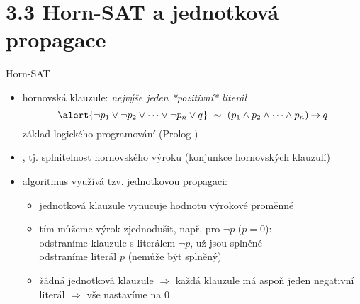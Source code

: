 \documentclass{beamer}
\begin{document}
\section{3.3 Horn-SAT a jednotková propagace}


\begin{frame}{Horn-SAT}

    \begin{itemize}
        \item \alert{hornovská klauzule}: \emph{nejvýše jeden *pozitivní* literál}
        $$
        \alert{\neg p_1\lor \neg p_2\lor \dots \lor \neg p_n\lor q}\ \sim\ (p_1\land p_2\land\dots \land p_n)\limplies q
        $$
        základ logického programování (Prolog )
        \item {}, tj. splnitelnost \alert{hornovského} výroku (konjunkce hornovských klauzulí) 
        \item algoritmus využívá tzv. \alert{jednotkovou propagaci}:  
        \begin{itemize}
            \item jednotková klauzule vynucuje hodnotu výrokové proměnné
            \item tím můžeme výrok zjednodušit, např. pro $\neg p$ ($p=0$):\\
            odstraníme klauzule s literálem $\neg p$, už jsou splněné\\
            odstraníme literál $p$ (nemůže být splněný)
            \item žádná jednotková klauzule $\Rightarrow$ každá klauzule má \alert{aspoň jeden negativní literál} $\Rightarrow$ vše nastavíme na 0
        \end{itemize}    
    \end{itemize}    
    
\end{frame}
\end{document}

